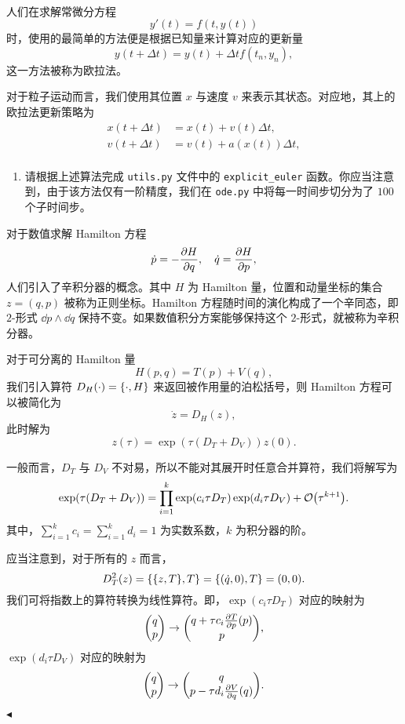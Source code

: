 \documentclass[11pt]{article}
\newenvironment{question}[2][Question]{\begin{trivlist}
\item[\hskip \labelsep {\bfseries #1}\hskip \labelsep {\bfseries #2.}]}{\hfill$\blacktriangleleft$\end{trivlist}}
\begin{document}
    \begin{question}{2 (30') (辛积分器)}~\\
    人们在求解常微分方程
        \[ y'(t) = f(t, y(t)) \]
    时，使用的最简单的方法便是根据已知量来计算对应的更新量
    \[y(t + \Delta t) = y(t) + \Delta t f(t_n, y_n), \]
    这一方法被称为欧拉法。

    对于粒子运动而言，我们使用其位置 $x$ 与速度 $v$ 来表示其状态。对应地，其上的欧拉法更新策略为
    \begin{equation*}
        \begin{aligned}
            x(t+\Delta t) &= x(t)+v(t) \Delta t, \\
            v(t+\Delta t) &= v(t)+a(x(t)) \Delta t, \\
        \end{aligned}
    \end{equation*}
    \begin{enumerate}
        \item [a (5')] 请根据上述算法完成 \texttt{utils.py} 文件中的 \texttt{explicit\_euler} 函数。你应当注意到，由于该方法仅有一阶精度，我们在 \texttt{ode.py} 中将每一时间步切分为了 $100$ 个子时间步。
    \end{enumerate}
    
    对于数值求解 Hamilton 方程
    \[ \dot{p} = -\pdv{H}{q}, \quad \dot{q} = \pdv{H}{p}, \]
    人们引入了辛积分器的概念。其中 $H$ 为 Hamilton 量，位置和动量坐标的集合 $z = (q, p)$ 被称为正则坐标。Hamilton 方程随时间的演化构成了一个辛同态，即 $2$-形式 $\dd{p} \wedge \dd{q}$ 保持不变。如果数值积分方案能够保持这个 $2$-形式，就被称为辛积分器。

    对于可分离的 Hamilton 量
    \[ H(p, q) = T(p) + V(q), \]
    我们引入算符 $D_H(\cdot) = \qty{\cdot, H}$ 来返回被作用量的泊松括号，则 Hamilton 方程可以被简化为
    \[ \dot{z} = D_H(z), \]
    此时解为
    \[ z(\tau) = \exp(\tau(D_T + D_V)) z(0). \]

    一般而言，$D_T$ 与 $D_V$ 不对易，所以不能对其展开时任意合并算符，我们将解写为
    \[ \exp(\tau(D_T + D_V)) = \prod_{i=1}^k \exp(c_i\tau D_T)\exp(d_i\tau D_V) + \order{\tau^{k+1}}. \]
    其中，$\sum_{i=1}^k c_i = \sum_{i=1}^k d_i = 1$ 为实数系数，$k$ 为积分器的阶。

    应当注意到，对于所有的 $z$ 而言，
    \[ D^2_T(z) = \qty{\qty{z, T}, T} = \qty{(\dot{q}, 0), T} = (0, 0). \]
    我们可将指数上的算符转换为线性算符。即，$\exp(c_i\tau D_T)$ 对应的映射为
    \[ \mqty(q \\ p) \to \mqty(q + \tau c_i \pdv{T}{p}\qty(p) \\ p), \]
    $\exp(d_i\tau D_V)$ 对应的映射为
    \[ \mqty(q \\ p) \to \mqty(q \\ p - \tau d_i \pdv{V}{q}\qty(q)). \]
    

\end{question}
\end{document}
